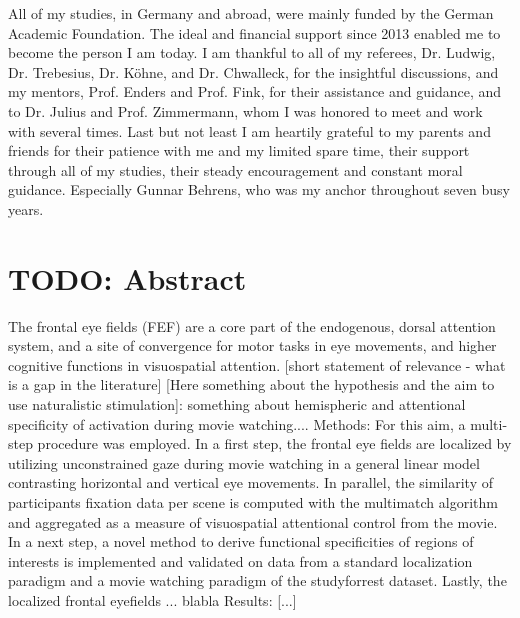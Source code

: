 \documentclass[a4paper, 12pt]{scrreprt}
\begin{document}
{All of my studies, in Germany and abroad, were mainly funded by the German Academic Foundation. The ideal and financial support since 2013 enabled me to become the person I am today. I am thankful to all of my referees, Dr. Ludwig, Dr. Trebesius, Dr. Köhne, and Dr. Chwalleck, for the insightful discussions, and my mentors, Prof. Enders and Prof. Fink, for their assistance and guidance, and to Dr. Julius and Prof. Zimmermann, whom I was honored to meet and work with several times. \newline
Last but not least I am heartily grateful to my parents and friends for their patience with me and my limited spare time, their support through all of my studies, their steady encouragement and constant moral guidance. Especially Gunnar Behrens, who was my anchor throughout seven busy years.}


\clearpage

\setcounter{page}{1}	%


\chapter*{TODO: Abstract}

The frontal eye fields (FEF) are a core part of the endogenous, dorsal attention system, and a site of convergence for motor tasks in eye movements, and higher cognitive functions in visuospatial attention. [short statement of relevance - what is a gap in the literature]  [Here something about the hypothesis and the aim to use naturalistic stimulation]: something about hemispheric and attentional specificity of activation during movie watching.... \newline
Methods:
For this aim, a multi-step procedure was employed. In a first step, the frontal eye fields are localized by utilizing unconstrained gaze during movie watching in a general linear model contrasting horizontal and vertical eye movements. In parallel, the similarity of participants fixation data per scene is computed with the multimatch algorithm and aggregated as a measure of visuospatial attentional control from the movie. In a next step, a novel method to derive functional specificities of regions of interests is implemented and validated on data from a standard localization paradigm and a movie watching paradigm of the studyforrest dataset. Lastly, the localized frontal eyefields ... blabla \newline
Results: [...]
\end{document}
